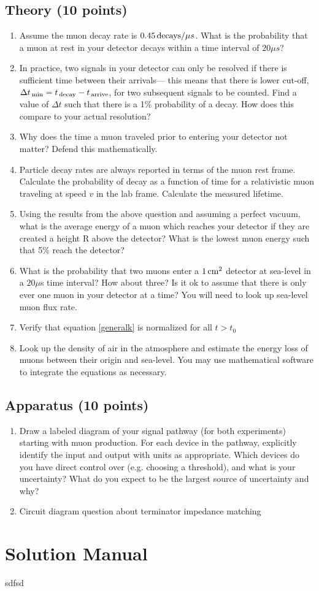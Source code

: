 \documentclass[aps,prb,groupedaddress,notitlepage,nofootinbib]{revtex4-1} %
\begin{document}
\subsection{Theory (10 points)}
\begin{enumerate}
\item Assume the muon decay rate is $0.45 \,\text{decays}/{\mu s}$. What is the probability that a muon at rest in your detector decays within a time interval of $20 \mu s$?
\item In practice, two signals in your detector can only be resolved if there is sufficient time between their arrivals--- this means that there is lower cut-off, $\Delta t_{\,\text{min}}=t_{\,\text{decay}}-t_{\,\text{arrive}}$, for two subsequent signals to be counted. Find a value of $\Delta t$ such that there is a 1\% probability of a decay. How does this compare to your actual resolution?
\item Why does the time a muon traveled prior to entering your detector not matter? Defend this mathematically.
\item Particle decay rates are always reported in terms of the muon rest frame. Calculate the probability of decay as a function of time for a relativistic muon traveling at speed $v$ in the lab frame. Calculate the measured lifetime.
\item Using the results from the above question and assuming a perfect vacuum, what is the average energy of a muon which reaches your detector if they are created a height R above the detector? What is the lowest muon energy such that 5\% reach the detector?
\item What is the probability that two muons enter a $1\,\text{cm}^{2}$ detector at sea-level in a $20\mu$s time interval? How about three? Is it ok to assume that there is only ever one muon in your detector at a time? You will need to look up sea-level muon flux rate.
\item Verify that equation \eqref{generalk} is normalized for all $t>t_0$
\item Look up the density of air in the atmosphere and estimate the energy loss of muons between their origin and sea-level. You may use mathematical software to integrate the equations as necessary. 
\end{enumerate}

\subsection{Apparatus (10 points)}
\begin{enumerate}
\item Draw a labeled diagram of your signal pathway (for both experiments) starting with muon production. For each device in the pathway, explicitly identify the input and output with units as appropriate. Which devices do you have direct control over (e.g. choosing a threshold), and what is your uncertainty? What do you expect to be the largest source of uncertainty and why?
\item Circuit diagram question about terminator impedance matching
\end{enumerate}
\newpage

\appendix
\section{Solution Manual}
\begin{align**}
sdfsd
\end{align**}
\end{document}
